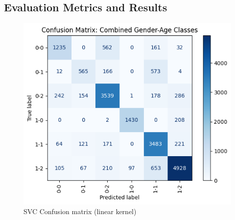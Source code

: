 \documentclass[10pt,twocolumn]{article}
\begin{document}
\subsection{Evaluation Metrics and Results}
\begin{figure}[H]
    \centering
    \includegraphics[width=1\linewidth]{images/svm/svm-cm-linear-vs-kernel-and-regularisation.png}
    \caption{SVC Confusion matrix (linear kernel)}
    \label{fig:svm-cm-kernels}
\end{figure}
\end{document}
